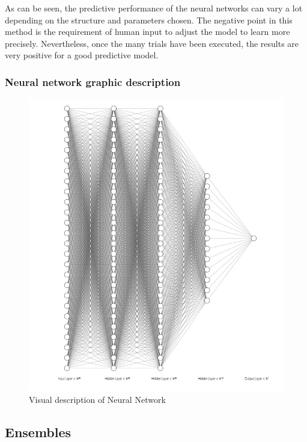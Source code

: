 \documentclass[
  paper=a4,
  ,captions=tableheading
]{scrartcl}
\begin{document}
As can be seen, the predictive performance of the neural networks can
vary a lot depending on the structure and parameters chosen. The
negative point in this method is the requirement of human input to
adjust the model to learn more precisely. Nevertheless, once the many
trials have been executed, the results are very positive for a good
predictive model.

\hypertarget{neural-network-graphic-description}{%
\subsubsection{Neural network graphic
description}\label{neural-network-graphic-description}}

\begin{figure}
\centering
\includegraphics{NN_rep.jpeg}
\caption{Visual description of Neural Network}
\end{figure}

\hypertarget{ensembles}{%
\subsection{Ensembles}\label{ensembles}}
\end{document}
